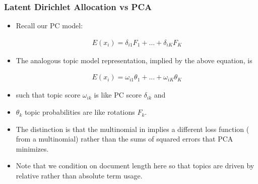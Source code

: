 \documentclass[
  shownotes,
  xcolor={svgnames},
  hyperref={colorlinks,citecolor=DarkBlue,linkcolor=DarkRed,urlcolor=DarkBlue}
  , aspectratio=169]{beamer}
\begin{document}
\begin{frame}
\frametitle{Latent Dirichlet Allocation vs PCA}

\begin{itemize}
\item Recall our PC model:

\begin{align}
E(x_i) = \delta_{i1} F_1 + \dots + \delta_{iK} F_K
\end{align}

\item The analogous topic model representation, implied by the above equation, is

\begin{align}
E(x_i) = \omega_{i1} \theta_1 + \dots + \omega_{iK} \theta_K
\end{align}

 

\item such that topic score $\omega_{ik}$ is like PC score $\delta_{ik}$ and 
\item $\theta_k$ topic probabilities are like rotations $F_k$. 
\item The distinction is that the multinomial in implies a different loss function ( from a multinomial) rather than the sums of squared errors that PCA minimizes. 
\item Note that we condition on document length here so that topics are driven by relative rather than absolute term usage. 
\end{itemize}

\end{frame}

\end{document}
